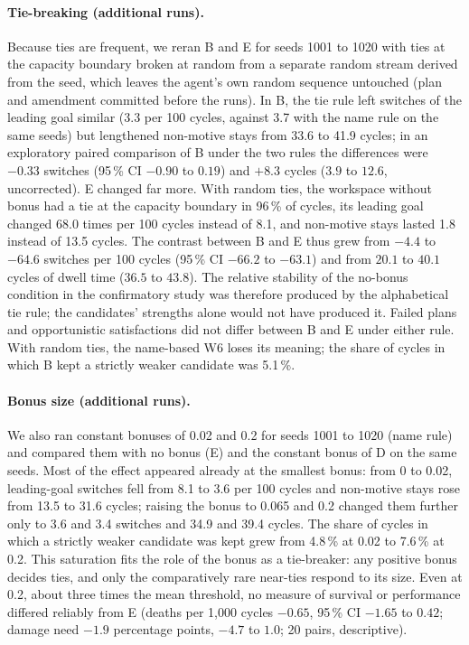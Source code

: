 \documentclass[11pt,a4paper]{article}
\begin{document}
\paragraph{Tie-breaking (additional runs).} Because ties are frequent, we reran B and E for seeds 1001 to 1020 with ties at the capacity boundary broken at random from a separate random stream derived from the seed, which leaves the agent's own random sequence untouched (plan and amendment committed before the runs). In B, the tie rule left switches of the leading goal similar (3.3 per 100 cycles, against 3.7 with the name rule on the same seeds) but lengthened non-motive stays from 33.6 to 41.9 cycles; in an exploratory paired comparison of B under the two rules the differences were $-0.33$ switches (95\,\% CI $-0.90$ to $0.19$) and $+8.3$ cycles ($3.9$ to $12.6$, uncorrected). E changed far more. With random ties, the workspace without bonus had a tie at the capacity boundary in 96\,\% of cycles, its leading goal changed 68.0 times per 100 cycles instead of 8.1, and non-motive stays lasted 1.8 instead of 13.5 cycles. The contrast between B and E thus grew from $-4.4$ to $-64.6$ switches per 100 cycles (95\,\% CI $-66.2$ to $-63.1$) and from $20.1$ to $40.1$ cycles of dwell time ($36.5$ to $43.8$). The relative stability of the no-bonus condition in the confirmatory study was therefore produced by the alphabetical tie rule; the candidates' strengths alone would not have produced it. Failed plans and opportunistic satisfactions did not differ between B and E under either rule. With random ties, the name-based W6 loses its meaning; the share of cycles in which B kept a strictly weaker candidate was 5.1\,\%.

\paragraph{Bonus size (additional runs).} We also ran constant bonuses of 0.02 and 0.2 for seeds 1001 to 1020 (name rule) and compared them with no bonus (E) and the constant bonus of D on the same seeds. Most of the effect appeared already at the smallest bonus: from 0 to 0.02, leading-goal switches fell from 8.1 to 3.6 per 100 cycles and non-motive stays rose from 13.5 to 31.6 cycles; raising the bonus to 0.065 and 0.2 changed them further only to 3.6 and 3.4 switches and 34.9 and 39.4 cycles. The share of cycles in which a strictly weaker candidate was kept grew from 4.8\,\% at 0.02 to 7.6\,\% at 0.2. This saturation fits the role of the bonus as a tie-breaker: any positive bonus decides ties, and only the comparatively rare near-ties respond to its size. Even at 0.2, about three times the mean threshold, no measure of survival or performance differed reliably from E (deaths per 1{,}000 cycles $-0.65$, 95\,\% CI $-1.65$ to $0.42$; damage need $-1.9$ percentage points, $-4.7$ to $1.0$; 20 pairs, descriptive).
\end{document}
